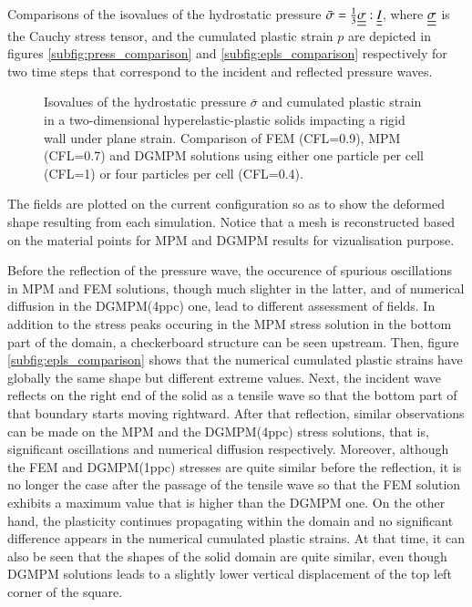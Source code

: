 Comparisons of the isovalues of the hydrostatic pressure $\bar{\sigma}=\frac{1}{3}{\underline{\underline{\sigma}}}:{\underline{\underline{I}}}$, where ${\underline{\underline{\sigma}}}$ is the Cauchy stress tensor, and the cumulated plastic strain $p$ are depicted in figures \ref{subfig:press_comparison} and \ref{subfig:epls_comparison} respectively for two time steps that correspond to the incident and reflected pressure waves.
\begin{figure}[ht]
  \centering
  \qquad
  \caption{Isovalues of the hydrostatic pressure $\bar{\sigma}$ and cumulated plastic strain in a two-dimensional hyperelastic-plastic solids impacting a rigid wall under plane strain. Comparison of FEM (CFL=0.9), MPM (CFL=0.7) and DGMPM solutions using either one particle per cell (CFL=1) or four particles per cell (CFL=0.4).}
  \label{fig:PS_taylor}
\end{figure}
The fields are plotted on the current configuration so as to show the deformed shape resulting from each simulation.
Notice that a mesh is reconstructed based on the material points for MPM and DGMPM results for vizualisation purpose.

Before the reflection of the pressure wave, the occurence of spurious oscillations in MPM and FEM solutions, though much slighter in the latter, and of numerical diffusion in the DGMPM(4ppc) one, lead to different assessment of fields.
In addition to the stress peaks occuring in the MPM stress solution in the bottom part of the domain, a checkerboard structure can be seen upstream.
Then, figure \ref{subfig:epls_comparison} shows that the numerical cumulated plastic strains have globally the same shape but different extreme values.
%
Next, the incident wave reflects on the right end of the solid as a tensile wave so that the bottom part of that boundary starts moving rightward.
After that reflection, similar observations can be made on the MPM and the DGMPM(4ppc) stress solutions, that is, significant oscillations and numerical diffusion respectively.
Moreover, although the FEM and DGMPM(1ppc) stresses are quite similar before the reflection, it is no longer the case after the passage of the tensile wave so that the FEM solution exhibits a maximum value that is higher than the DGMPM one.
On the other hand, the plasticity continues propagating within the domain and no significant difference appears in the numerical cumulated plastic strains.
At that time, it can also be seen that the shapes of the solid domain are quite similar, even though DGMPM solutions leads to a slightly lower vertical displacement of the top left corner of the square.

